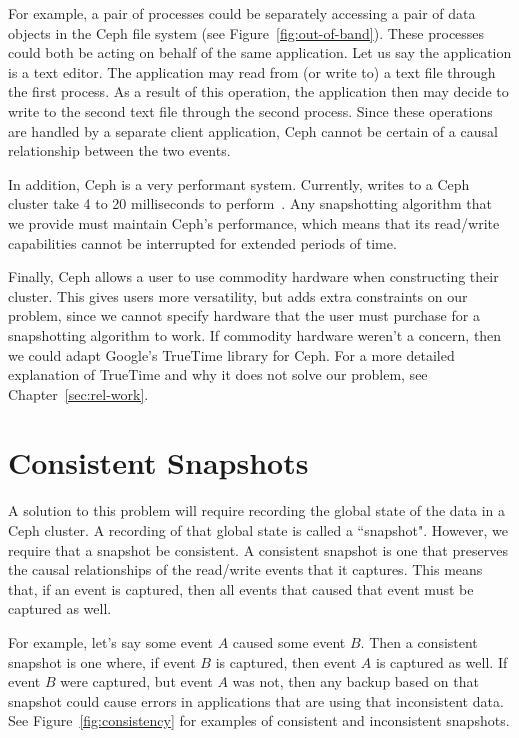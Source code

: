For example, a pair of processes could be separately accessing a pair of
data objects in the Ceph file system (see
Figure~\ref{fig:out-of-band}). These processes could both be acting on
behalf of the same application. Let us say the application is a text
editor. The application may read from (or write to) a text file
through the first process.  As a result of this operation, the
application then may decide to write to the second text file through
the second process. Since these operations are handled by a separate
client application, Ceph cannot be certain of a causal relationship between the
two events.

In addition, Ceph is a very performant system. Currently, writes to a
Ceph cluster take 4 to 20 milliseconds to perform~\citep{Sage}. Any
snapshotting algorithm that we provide must maintain Ceph's performance, which means
that its read/write capabilities cannot be interrupted for extended
periods of time.

Finally, Ceph allows a user to use commodity hardware when
constructing their cluster. This gives users more versatility, but
adds extra constraints on our problem, since we cannot specify
hardware that the user must purchase for a snapshotting algorithm to work. If commodity 
hardware weren't a concern, then we could adapt Google's TrueTime library for 
Ceph. For a more detailed explanation of TrueTime
and why it does not solve our problem, see Chapter~\ref{sec:rel-work}.

\section{Consistent Snapshots}

A solution to this problem will require recording the global state of the 
data in a Ceph cluster. A recording of that global state is called a 
``snapshot". However, we require that a snapshot be consistent. 
A consistent snapshot is one that preserves the causal relationships 
of the read/write events that it captures. This means that, if an 
event is captured, then all events that caused that 
event must be captured as well. 

For example, let's say some event $A$ caused some event $B$. 
Then a consistent snapshot 
is one where, if event $B$ is captured, then event $A$ is captured as well. If
event $B$ were captured, but event $A$ was not, then any backup based on that
snapshot could cause errors in applications that are using that inconsistent
data. See Figure~\ref{fig:consistency} for examples of consistent and 
inconsistent snapshots.

